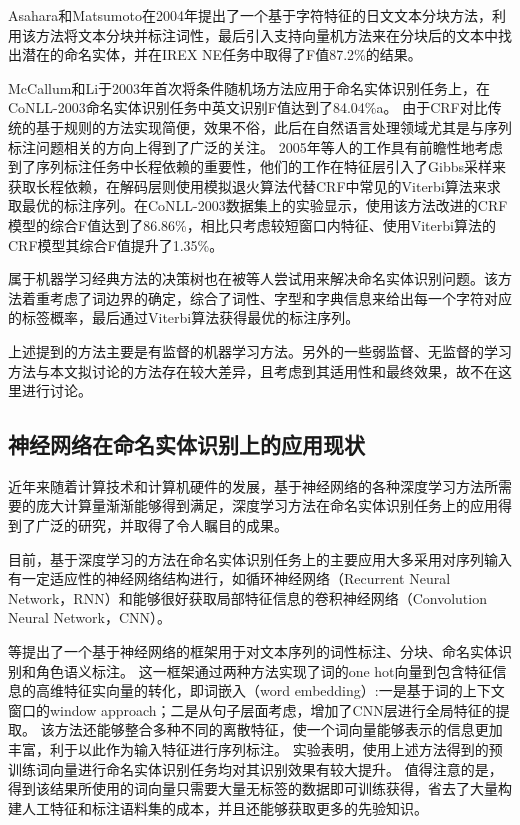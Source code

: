 Asahara和Matsumoto\citep{asahara2003japanese}在2004年提出了一个基于字符特征的日文文本分块方法，利用该方法将文本分块并标注词性，最后引入支持向量机方法来在分块后的文本中找出潜在的命名实体，并在IREX NE任务中取得了F值87.2\%的结果。

McCallum和Li\citep{mccallum2003early}于2003年首次将条件随机场方法应用于命名实体识别任务上，在CoNLL-2003命名实体识别任务中英文识别F值达到了84.04\%a。
由于CRF对比传统的基于规则的方法实现简便，效果不俗，此后在自然语言处理领域尤其是与序列标注问题相关的方向上得到了广泛的关注。
2005年\citet{finkel2005incorporating}等人的工作具有前瞻性地考虑到了序列标注任务中长程依赖的重要性，他们的工作在特征层引入了Gibbs采样来获取长程依赖，在解码层则使用模拟退火算法代替CRF中常见的Viterbi算法来求取最优的标注序列。在CoNLL-2003数据集上的实验显示，使用该方法改进的CRF模型的综合F值达到了86.86\%，相比只考虑较短窗口内特征、使用Viterbi算法的CRF模型其综合F值提升了1.35\%。

属于机器学习经典方法的决策树也在被\citet{sekine1998decision}等人尝试用来解决命名实体识别问题。该方法着重考虑了词边界的确定，综合了词性、字型和字典信息来给出每一个字符对应的标签概率，最后通过Viterbi算法获得最优的标注序列。

上述提到的方法主要是有监督的机器学习方法。另外的一些弱监督、无监督的学习方法与本文拟讨论的方法存在较大差异，且考虑到其适用性和最终效果，故不在这里进行讨论。

\subsection{神经网络在命名实体识别上的应用现状}
近年来随着计算技术和计算机硬件的发展，基于神经网络的各种深度学习方法所需要的庞大计算量渐渐能够得到满足，深度学习方法在命名实体识别任务上的应用得到了广泛的研究，并取得了令人瞩目的成果。

目前，基于深度学习的方法在命名实体识别任务上的主要应用大多采用对序列输入有一定适应性的神经网络结构进行，如循环神经网络（Recurrent Neural Network，RNN）和能够很好获取局部特征信息的卷积神经网络（Convolution Neural Network，CNN）。

\citet{collobert2011natural}等提出了一个基于神经网络的框架用于对文本序列的词性标注、分块、命名实体识别和角色语义标注。
这一框架通过两种方法实现了词的one hot向量到包含特征信息的高维特征实向量的转化，即词嵌入（word embedding）:一是基于词的上下文窗口的window approach；二是从句子层面考虑，增加了CNN层进行全局特征的提取。
该方法还能够整合多种不同的离散特征，使一个词向量能够表示的信息更加丰富，利于以此作为输入特征进行序列标注。
实验表明，使用上述方法得到的预训练词向量进行命名实体识别任务均对其识别效果有较大提升。
值得注意的是，得到该结果所使用的词向量只需要大量无标签的数据即可训练获得，省去了大量构建人工特征和标注语料集的成本，并且还能够获取更多的先验知识。

